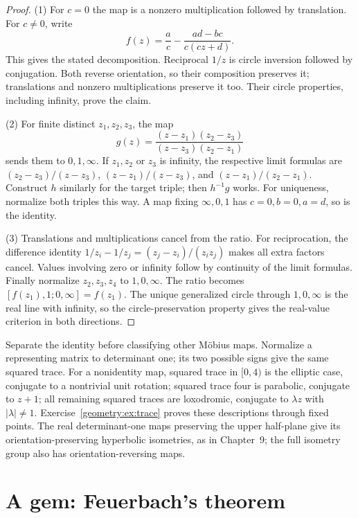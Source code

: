 \begin{proof}
(1) For $c=0$ the map is a nonzero multiplication followed by translation. For $c\ne0$, write
\[
f(z)=\frac ac-\frac{ad-bc}{c(cz+d)}.
\]
This gives the stated decomposition. Reciprocal $1/z$ is circle inversion followed by conjugation. Both reverse orientation, so their composition preserves it; translations and nonzero multiplications preserve it too. Their circle properties, including infinity, prove the claim.

(2) For finite distinct $z_1,z_2,z_3$, the map
\[
g(z)=\frac{(z-z_1)(z_2-z_3)}{(z-z_3)(z_2-z_1)}
\]
sends them to $0,1,\infty$. If $z_1,z_2$ or $z_3$ is infinity, the respective limit formulas are
$(z_2-z_3)/(z-z_3)$, $(z-z_1)/(z-z_3)$, and $(z-z_1)/(z_2-z_1)$.
Construct $h$ similarly for the target triple; then $h^{-1}g$ works. For uniqueness, normalize both triples this way. A map fixing $\infty,0,1$ has $c=0,b=0,a=d$, so is the identity.

(3) Translations and multiplications cancel from the ratio. For reciprocation, the difference identity $1/z_i-1/z_j=(z_j-z_i)/(z_iz_j)$ makes all extra factors cancel. Values involving zero or infinity follow by continuity of the limit formulas. Finally normalize $z_2,z_3,z_4$ to $1,0,\infty$. The ratio becomes $[f(z_1),1;0,\infty]=f(z_1)$. The unique generalized circle through $1,0,\infty$ is the real line with infinity, so the circle-preservation property gives the real-value criterion in both directions.
\end{proof}

\begin{remark}
Separate the identity before classifying other M\"obius maps. Normalize a representing matrix to determinant one; its two possible signs give the same squared trace. For a nonidentity map, squared trace in $[0,4)$ is the elliptic case, conjugate to a nontrivial unit rotation; squared trace four is parabolic, conjugate to $z+1$; all remaining squared traces are loxodromic, conjugate to $\lambda z$ with $|\lambda|\ne1$. Exercise~\ref{geometry:ex:trace} proves these descriptions through fixed points. The real determinant-one maps preserving the upper half-plane give its orientation-preserving hyperbolic isometries, as in Chapter~9; the full isometry group also has orientation-reversing maps.
\end{remark}

\section{A gem: Feuerbach's theorem}


